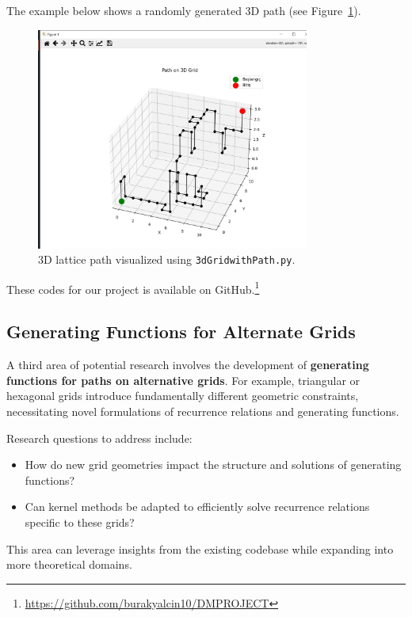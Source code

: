 \documentclass{article}
\begin{document}
The example below shows a randomly generated 3D path (see Figure~\ref{fig:3d-path}).

\begin{figure}[H]
    \centering
    \includegraphics[width=0.8\textwidth]{images/3dpath.jpg}
    \caption{3D lattice path visualized using \texttt{3dGridwithPath.py}.}
    \label{fig:3d-path}
\end{figure}

These codes for our project is available on GitHub.\footnote{\url{https://github.com/burakyalcin10/DMPROJECT}}



\subsection{Generating Functions for Alternate Grids}
A third area of potential research involves the development of \textbf{generating functions for paths on alternative grids}. For example, triangular or hexagonal grids introduce fundamentally different geometric constraints, necessitating novel formulations of recurrence relations and generating functions.

Research questions to address include:
\begin{itemize}
    \item How do new grid geometries impact the structure and solutions of generating functions?
    \item Can kernel methods be adapted to efficiently solve recurrence relations specific to these grids?
\end{itemize}

This area can leverage insights from the existing codebase while expanding into more theoretical domains.
\end{document}
